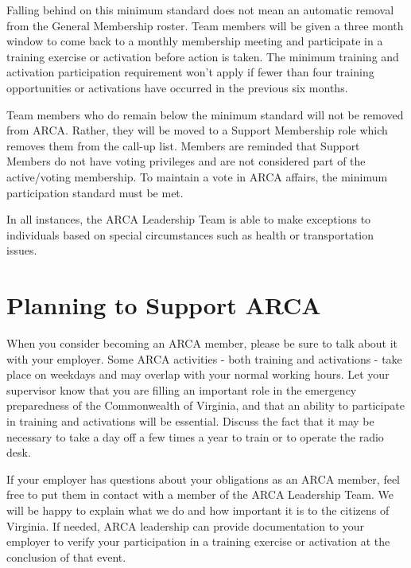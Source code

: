 \documentclass[pdflatex,letterpaper,twoside,12pt]{book}
\begin{document}
Falling behind on this minimum standard does not mean an automatic removal from the General Membership roster.  Team members will be given a three month window to come back to a monthly membership meeting and participate in a training exercise or activation before action is taken.  The minimum training and activation participation requirement won't apply if fewer than four training opportunities or activations have occurred in the previous six months.

Team members who do remain below the minimum standard will not be removed from ARCA.  Rather, they will be moved to a Support Membership role which removes them from the call-up list.  Members are reminded that Support Members do not have voting privileges and are not considered part of the active/voting membership.  To maintain a vote in ARCA affairs, the minimum participation standard must be met.

In all instances, the ARCA Leadership Team is able to make exceptions to individuals based on special circumstances such as health or transportation issues.


\section{Planning to Support ARCA}

When you consider becoming an ARCA member, please be sure to talk about it with your employer.  Some ARCA activities - both training and activations - take place on weekdays and may overlap with your normal working hours.  Let your supervisor know that you are filling an important role in the emergency preparedness of the Commonwealth of Virginia, and that an ability to participate in training and activations will be essential.  Discuss the fact that it may be necessary to take a day off a few times a year to train or to operate the radio desk.

If your employer has questions about your obligations as an ARCA member, feel free to put them in contact with a member of the ARCA Leadership Team.  We will be happy to explain what we do and how important it is to the citizens of Virginia.  If needed, ARCA leadership can provide documentation to your employer to verify your participation in a training exercise or activation at the conclusion of that event.
\end{document}
